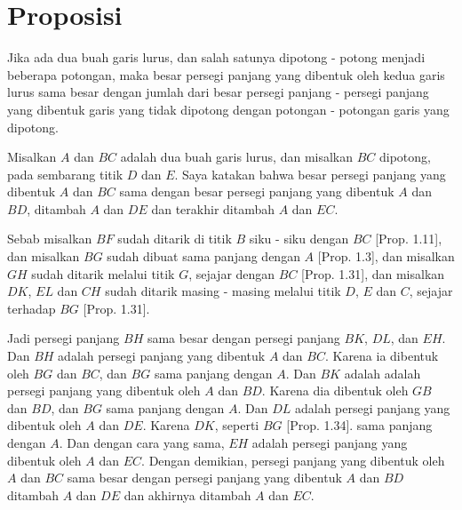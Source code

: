 \documentclass[a4paper]{book}
\begin{document}
\section*{\centering Proposisi \thesection} 
Jika ada dua buah garis lurus, dan salah satunya dipotong - potong menjadi 
beberapa potongan, maka besar persegi panjang yang dibentuk oleh kedua garis lurus
 sama besar dengan jumlah dari besar persegi panjang - persegi panjang yang dibentuk
 garis yang tidak dipotong dengan potongan - potongan garis yang dipotong.


\begin{center}
\end{center}

Misalkan $A$ dan $BC$ adalah dua buah garis lurus, dan misalkan $BC$ dipotong,
pada sembarang titik $D$ dan $E$. Saya katakan bahwa besar persegi panjang yang 
dibentuk $A$ dan $BC$ sama dengan besar persegi panjang yang dibentuk $A$ 
dan $BD$, ditambah $A$ dan $DE$ dan terakhir ditambah $A$ dan $EC$.

Sebab misalkan $BF$ sudah ditarik di titik $B$ siku - siku dengan $BC$ 
[Prop. 1.11], dan misalkan $BG$ sudah dibuat sama panjang dengan $A$ 
[Prop. 1.3], dan misalkan $GH$ sudah ditarik melalui titik $G$, sejajar dengan
$BC$ [Prop. 1.31], dan misalkan $DK$, $EL$ dan $CH$ sudah ditarik masing 
- masing melalui titik $D$, $E$ dan $C$, sejajar terhadap $BG$ [Prop. 1.31].  

Jadi persegi panjang $BH$ sama besar dengan persegi panjang $BK$, $DL$, dan 
$EH$. Dan $BH$ adalah persegi panjang yang dibentuk $A$ dan $BC$. Karena ia
dibentuk oleh $BG$ dan $BC$, dan $BG$ sama panjang dengan $A$. Dan $BK$ adalah
adalah persegi panjang yang dibentuk oleh $A$ dan $BD$. Karena dia dibentuk oleh
$GB$ dan $BD$, dan $BG$ sama panjang dengan $A$. Dan $DL$ adalah persegi panjang 
yang dibentuk oleh $A$ dan $DE$. Karena $DK$, seperti $BG$ [Prop. 1.34]. sama 
panjang dengan $A$. Dan dengan cara yang sama,  $EH$ adalah persegi panjang
yang dibentuk oleh $A$ dan $EC$. Dengan demikian, persegi panjang yang
dibentuk oleh $A$ dan $BC$ sama besar dengan persegi panjang yang dibentuk
$A$ dan $BD$ ditambah $A$ dan $DE$ dan akhirnya ditambah $A$ dan $EC$. 
\end{document}
